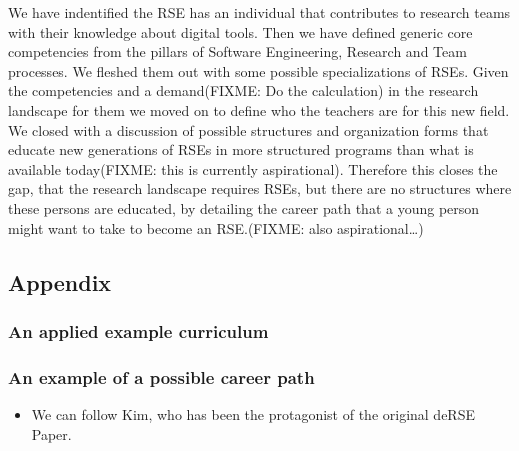 \documentclass[a4paper
]{article}
\providecommand{\tightlist}{%
  \setlength{\itemsep}{0pt}\setlength{\parskip}{0pt}}
\begin{document}
We have indentified the RSE has an individual that contributes to
research teams with their knowledge about digital tools. Then we have
defined generic core competencies from the pillars of Software
Engineering, Research and Team processes. We fleshed them out with some
possible specializations of RSEs. Given the competencies and a
demand(FIXME: Do the calculation) in the research landscape for them we
moved on to define who the teachers are for this new field. We closed
with a discussion of possible structures and organization forms that
educate new generations of RSEs in more structured programs than what is
available today(FIXME: this is currently aspirational). Therefore this
closes the gap, that the research landscape requires RSEs, but there are
no structures where these persons are educated, by detailing the career
path that a young person might want to take to become an RSE.(FIXME:
also aspirational\ldots)

\hypertarget{appendix}{%
\subsection{Appendix}\label{appendix}}

\hypertarget{an-applied-example-curriculum}{%
\subsubsection{An applied example
curriculum}\label{an-applied-example-curriculum}}

\hypertarget{an-example-of-a-possible-career-path}{%
\subsubsection{An example of a possible career
path}\label{an-example-of-a-possible-career-path}}

\begin{itemize}
\tightlist
\item
  We can follow Kim, who has been the protagonist of the original deRSE
  Paper.
\end{itemize}

\printbibliography
\end{document}
